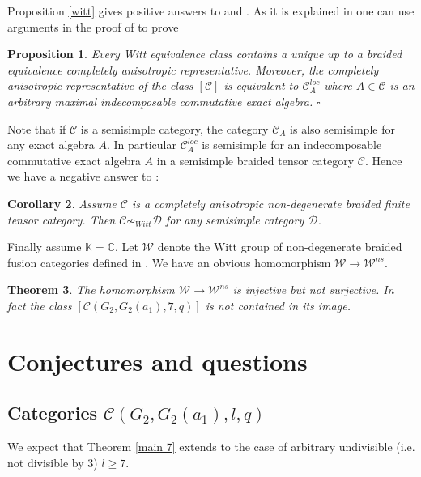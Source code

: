 \documentclass{amsart}
\newtheorem{theorem}{Theorem}[section]
\newtheorem{proposition}[theorem]{Proposition}
\newtheorem{corollary}[theorem]{Corollary}
\theoremstyle{definition}
\newcommand{\C}{\mathcal{C}}
\newcommand{\D}{\mathcal{D}}
\newcommand{\W}{\mathcal{W}}
\newcommand{\BC}{\mathbb{C}}
\newcommand{\K}{\mathbb{K}}
\numberwithin{equation}{section}
\begin{document}
Proposition \ref{witt} gives positive answers to \cite[Question 7.18]{ShYa} and
\cite[Question 7.21]{ShYa}. As it is explained in \cite[7.4.5]{ShYa} one can use
arguments in the proof of \cite[Theorem 5.13]{DMNO} to prove 

\begin{proposition}
    Every Witt equivalence class contains a unique up to a braided equivalence 
    completely anisotropic representative. Moreover, the completely anisotropic
    representative of the class $[\C]$ is equivalent to $\C_A^{loc}$ where
    $A\in \C$ is an arbitrary maximal indecomposable commutative exact algebra. $\square$
\end{proposition}

Note that if $\C$ is a semisimple category, the category $\C_A$ is also semisimple for
any exact algebra $A$. In particular $\C_A^{loc}$ is semisimple for an indecomposable commutative exact algebra $A$ in a semisimple braided tensor category $\C$. 
Hence we have a negative answer to \cite[Question 7.19]{ShYa}:

\begin{corollary}
    Assume $\C$ is a completely anisotropic non-degenerate braided finite tensor
    category. Then $\C \not \sim_{Witt}\D$ for any semisimple category $\D$.
\end{corollary}

Finally assume $\K=\BC$. Let $\W$ denote the Witt group of non-degenerate
braided fusion categories defined in \cite[5.1]{DMNO}. We have an obvious
homomorphism $\W \to \W^{ns}$.

\begin{theorem}
    The homomorphism $\W \to \W^{ns}$ is injective but not surjective.
    In fact the class $[\C(G_2,G_2(a_1),7,q)]$ is not contained in its image.
\end{theorem}

\section{Conjectures and questions}\label{genconj}
\subsection{Categories $\C(G_2,G_2(a_1),l,q)$}
We expect that Theorem \ref{main 7} extends to the case of arbitrary undivisible (i.e. not
divisible by 3) $l\ge 7$.
\end{document}

